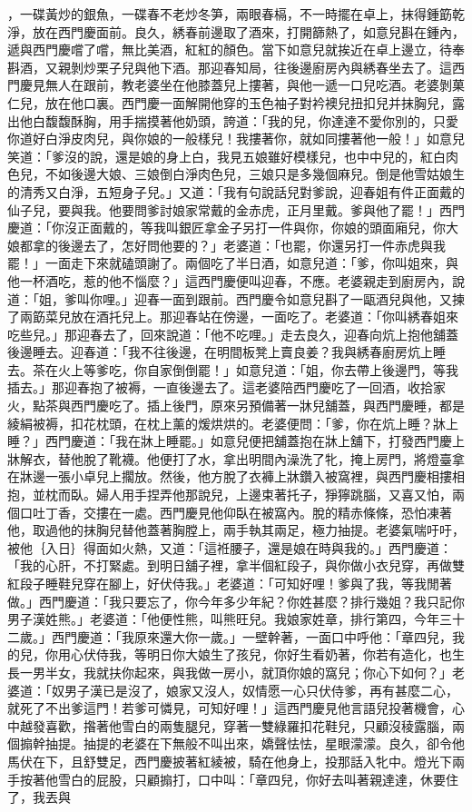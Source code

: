 \begin{showcontents}{}
，一碟黃炒的銀魚，一碟春不老炒冬笋，兩眼春槅，不一時擺在卓上，抹得鍾筯乾淨，放在西門慶面前。良久，綉春前邊取了酒來，打開篩熱了，如意兒斟在鍾內，遞與西門慶嚐了嚐，無比美酒，紅紅的顏色。當下如意兒就挨近在卓上邊立，待奉斟酒，又親剝炒栗子兒與他下酒。那迎春知局，往後邊廚房內與綉春坐去了。這西門慶見無人在跟前，教老婆坐在他膝蓋兒上摟著，與他一遞一口兒吃酒。老婆剝菓仁兒，放在他口裏。西門慶一面解開他穿的玉色袖子對衿襖兒扭扣兒并抹胸兒，露出他白馥馥酥胸，用手揣摸著他奶頭，誇道：「我的兒，你達達不愛你別的，只愛你道好白淨皮肉兒，與你娘的一般樣兒！我摟著你，就如同摟著他一般！」如意兒笑道：「爹沒的說，還是娘的身上白，我見五娘雖好模樣兒，也中中兒的，紅白肉色兒，不如後邊大娘、三娘倒白淨肉色兒，三娘只是多幾個麻兒。倒是他雪姑娘生的清秀又白淨，五短身子兒。」又道：「我有句說話兒對爹說，迎春姐有件正面戴的仙子兒，要與我。他要問爹討娘家常戴的金赤虎，正月里戴。爹與他了罷！」西門慶道：「你沒正面戴的，等我叫銀匠拿金子另打一件與你，你娘的頭面廂兒，你大娘都拿的後邊去了，怎好問他要的？」老婆道：「也罷，你還另打一件赤虎與我罷！」一面走下來就磕頭謝了。兩個吃了半日酒，如意兒道：「爹，你叫姐來，與他一杯酒吃，惹的他不惱麼？」這西門慶便叫迎春，不應。老婆親走到廚房內，說道：「姐，爹叫你哩。」迎春一面到跟前。西門慶令如意兒斟了一甌酒兒與他，又揀了兩筯菜兒放在酒托兒上。那迎春站在傍邊，一面吃了。老婆道：「你叫綉春姐來吃些兒。」那迎春去了，回來說道：「他不吃哩。」走去良久，迎春向炕上抱他舖蓋後邊睡去。迎春道：「我不往後邊，在明間板凳上賣良姜？我與綉春廚房炕上睡去。茶在火上等爹吃，你自家倒倒罷！」如意兒道：「姐，你去帶上後邊門，等我插去。」那迎春抱了被褥，一直後邊去了。這老婆陪西門慶吃了一回酒，收拾家火，點茶與西門慶吃了。插上後門，原來另預備著一牀兒舖蓋，與西門慶睡，都是綾絹被褥，扣花枕頭，在枕上薰的煖烘烘的。老婆便問：「爹，你在炕上睡？牀上睡？」西門慶道：「我在牀上睡罷。」如意兒便把舖蓋抱在牀上舖下，打發西門慶上牀解衣，替他脫了靴襪。他便打了水，拿出明間內澡洗了牝，掩上房門，將燈臺拿在牀邊一張小卓兒上擱放。然後，他方脫了衣褲上牀鑽入被窩裡，與西門慶相摟相抱，並枕而臥。婦人用手捏弄他那說兒，上邊束著托子，猙獰跳腦，又喜又怕，兩個口吐丁香，交摟在一處。西門慶見他仰臥在被窩內。脫的精赤條條，恐怕凍著他，取過他的抹胸兒替他蓋著胸膛上，兩手執其兩足，極力抽提。老婆氣喘吁吁，被他｛入日｝得面如火熱，又道：「這袵腰子，還是娘在時與我的。」西門慶道：「我的心肝，不打緊處。到明日舖子裡，拿半個紅段子，與你做小衣兒穿，再做雙紅段子睡鞋兒穿在腳上，好伏侍我。」老婆道：「可知好哩！爹與了我，等我閒著做。」西門慶道：「我只要忘了，你今年多少年紀？你姓甚麼？排行幾姐？我只記你男子漢姓熊。」老婆道：「他便性熊，叫熊旺兒。我娘家姓章，排行第四，今年三十二歲。」西門慶道：「我原來還大你一歲。」一壁幹著，一面口中呼他：「章四兒，我的兒，你用心伏侍我，等明日你大娘生了孩兒，你好生看奶著，你若有造化，也生長一男半女，我就扶你起來，與我做一房小，就頂你娘的窩兒；你心下如何？」老婆道：「奴男子漢已是沒了，娘家又沒人，奴情愿一心只伏侍爹，再有甚麼二心，就死了不出爹這門！若爹可憐見，可知好哩！」這西門慶見他言語兒投著機會，心中越發喜歡，揝著他雪白的兩隻腿兒，穿著一雙綠羅扣花鞋兒，只顧沒稜露腦，兩個搧幹抽提。抽提的老婆在下無般不叫出來，嬌聲怯怯，星眼濛濛。良久，卻令他馬伏在下，且舒雙足，西門慶披著紅綾被，騎在他身上，投那話入牝中。燈光下兩手按著他雪白的屁股，只顧搧打，口中叫：「章四兒，你好去叫著親達達，休要住了，我丟與
\end{showcontents}
